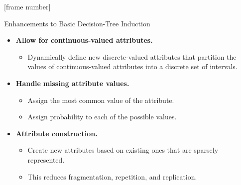 \documentclass[aspectratio=169,t,table]{beamer}
\begin{document}
  {
    [frame number]
    \begin{frame}{Enhancements to Basic Decision-Tree Induction}
      \begin{itemize}
        \item \textbf{Allow for} \textbf{\color{airforceblue}continuous-valued attributes.}
        \begin{itemize}
          \item Dynamically define new discrete-valued attributes that partition the values of continuous-valued attributes into a discrete set of intervals.
        \end{itemize}
        \item \textbf{Handle} \textbf{\color{airforceblue}missing attribute values.}
        \begin{itemize}
          \item Assign the most common value of the attribute.
          \item Assign probability to each of the possible values.
        \end{itemize}
      \item \textbf{\color{airforceblue}Attribute construction.}
      \begin{itemize}
        \item Create new attributes based on existing ones that are sparsely represented.
        \item This reduces fragmentation, repetition, and replication.
      \end{itemize}
      \end{itemize}
    \end{frame}
  }
\end{document}
